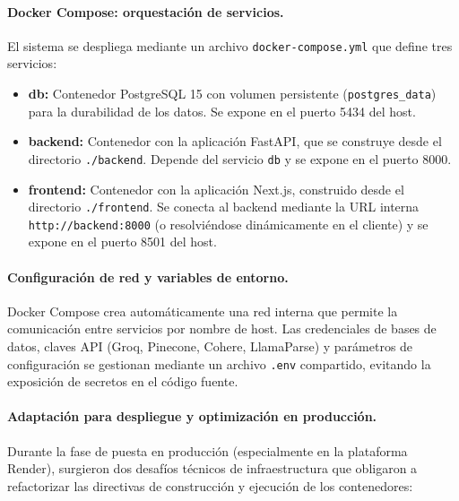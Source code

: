 \documentclass[12pt,a4paper,oneside]{report}
\begin{document}
\paragraph{Docker Compose: orquestación de servicios.} El sistema se despliega mediante un archivo \texttt{docker-compose.yml} que define tres servicios:

\begin{itemize}
    \item \textbf{db:} Contenedor PostgreSQL 15 con volumen persistente (\texttt{postgres\_data}) para la durabilidad de los datos. Se expone en el puerto 5434 del host.
    \item \textbf{backend:} Contenedor con la aplicación FastAPI, que se construye desde el directorio \texttt{./backend}. Depende del servicio \texttt{db} y se expone en el puerto 8000.
    \item \textbf{frontend:} Contenedor con la aplicación Next.js, construido desde el directorio \texttt{./frontend}. Se conecta al backend mediante la URL interna \texttt{http://backend:8000} (o resolviéndose dinámicamente en el cliente) y se expone en el puerto 8501 del host.
\end{itemize}

\paragraph{Configuración de red y variables de entorno.} Docker Compose crea automáticamente una red interna que permite la comunicación entre servicios por nombre de host. Las credenciales de bases de datos, claves API (Groq, Pinecone, Cohere, LlamaParse) y parámetros de configuración se gestionan mediante un archivo \texttt{.env} compartido, evitando la exposición de secretos en el código fuente.

\paragraph{Adaptación para despliegue y optimización en producción.} Durante la fase de puesta en producción (especialmente en la plataforma Render), surgieron dos desafíos técnicos de infraestructura que obligaron a refactorizar las directivas de construcción y ejecución de los contenedores:
\end{document}
